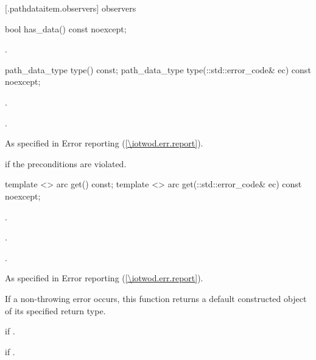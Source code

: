  [\iotwod.pathdataitem.observers] { observers}

\begin{itemdecl}
    bool has_data() const noexcept;
\end{itemdecl}
\begin{itemdescr}
	\pnum
	\returns
	.
	
\end{itemdescr}

\begin{itemdecl}
    path_data_type type() const;
    path_data_type type(::std::error_code& ec) const noexcept;
\end{itemdecl}
\begin{itemdescr}
	\pnum
	\preconditions
	.
	
	\pnum
	\returns
	.
	
	\pnum
	\throws
	As specified in Error reporting (\ref{\iotwod.err.report}).
	
	\pnum
	\errors
	 if the preconditions are violated.

\end{itemdescr}

\begin{itemdecl}
    template <>
    arc get() const;
    template <>
    arc get(::std::error_code& ec) const noexcept;
\end{itemdecl}
\begin{itemdescr}
	\pnum
	\preconditions
	.
	
	\pnum
	.
	
	\pnum
	\returns
	.
	
	\pnum
	\throws
	As specified in Error reporting (\ref{\iotwod.err.report}).
	
	\pnum
	\remarks
	If a non-throwing error occurs, this function returns a default constructed object of its specified return type.
	
	\pnum
	\errors
	 if .
	
	\pnum
	 if .

\end{itemdescr}

